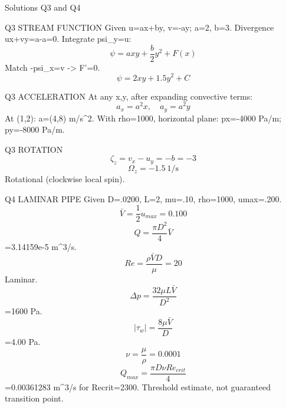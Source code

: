 Solutions Q3 and Q4

Q3 STREAM FUNCTION
Given u=ax+by, v=-ay; a=2, b=3.
Divergence ux+vy=a-a=0.
Integrate psi_y=u:
$$\psi=axy+\frac{b}{2}y^2+F(x)$$
Match -psi_x=v -> F'=0.
$$\psi=2xy+1.5y^2+C$$

Q3 ACCELERATION
At any x,y, after expanding convective terms:
$$a_x=a^2x,\quad a_y=a^2y$$
At (1,2): a=(4,8) m/s^2.
With rho=1000, horizontal plane:
px=-4000 Pa/m; py=-8000 Pa/m.

Q3 ROTATION
$$\zeta_z=v_x-u_y=-b=-3$$
$$\Omega_z=-1.5\ \text{1/s}$$
Rotational (clockwise local spin).

Q4 LAMINAR PIPE
Given D=.0200, L=2, mu=.10, rho=1000, umax=.200.
$$\bar V=\frac{1}{2}u_{max}=0.100$$
$$Q=\frac{\pi D^2}{4}\bar V$$
=3.14159e-5 m^3/s.
$$Re=\frac{\rho\bar VD}{\mu}=20$$
Laminar.
$$\Delta p=\frac{32\mu L\bar V}{D^2}$$
=1600 Pa.
$$|\tau_w|=\frac{8\mu\bar V}{D}$$
=4.00 Pa.
$$\nu=\frac{\mu}{\rho}=0.0001$$
$$Q_{max}=\frac{\pi D\nu Re_{crit}}{4}$$
=0.00361283 m^3/s for Recrit=2300. Threshold estimate, not guaranteed transition point.
